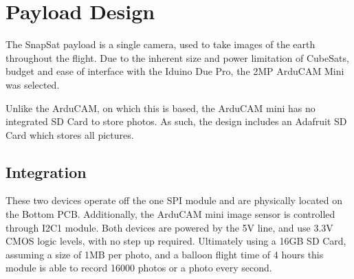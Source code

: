 \section{Payload Design}

The SnapSat payload is a single camera, used to take images of the earth throughout the flight.
Due to the inherent size and power limitation of CubeSats, budget and ease of interface with the Iduino Due Pro, the 2MP ArduCAM Mini was selected.

\begin{figure}[H]
    \label{fig:arducam}
\end{figure}

Unlike the ArduCAM, on which this is based, the ArduCAM mini has no integrated SD Card to store photos.  As such, the design includes an Adafruit SD Card which stores all pictures.

\begin{figure}[H]
    \label{fig:sdcard}
\end{figure}

\subsection{Integration}

These two devices operate off the one SPI module and are physically located on the Bottom PCB.  Additionally, the ArduCAM mini image sensor is controlled through I2C1 module.  Both devices are powered by the 5V line, and use 3.3V CMOS logic levels, with no step up required. Ultimately using a 16GB SD Card, assuming a size of 1MB per photo, and a balloon flight time of 4 hours this module is able to record 16000 photos or a photo every second.